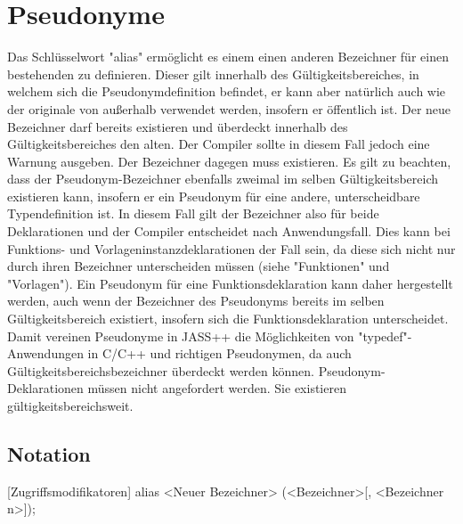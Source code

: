 \chapter{Pseudonyme}

Das Schlüsselwort "alias" ermöglicht es einem einen anderen Bezeichner für einen bestehenden zu definieren. Dieser gilt innerhalb
des Gültigkeitsbereiches, in welchem sich die Pseudonymdefinition befindet, er kann aber natürlich auch wie der originale von außerhalb
verwendet werden, insofern er öffentlich ist.
Der neue Bezeichner darf bereits existieren und überdeckt innerhalb des Gültigkeitsbereiches den alten. Der Compiler sollte in
diesem Fall jedoch eine Warnung ausgeben.
Der Bezeichner dagegen muss existieren.
Es gilt zu beachten, dass der Pseudonym-Bezeichner ebenfalls zweimal im selben Gültigkeitsbereich existieren kann,
insofern er ein Pseudonym für eine andere, unterscheidbare Typendefinition ist.
In diesem Fall gilt der Bezeichner also für beide Deklarationen und der Compiler entscheidet nach Anwendungsfall.
Dies kann bei Funktions- und Vorlageninstanzdeklarationen der Fall sein, da diese sich nicht nur durch ihren Bezeichner
unterscheiden müssen (siehe "Funktionen" und "Vorlagen").
Ein Pseudonym für eine Funktionsdeklaration kann daher hergestellt werden, auch wenn der Bezeichner des Pseudonyms bereits
im selben Gültigkeitsbereich existiert, insofern sich die Funktionsdeklaration unterscheidet.
Damit vereinen Pseudonyme in JASS++ die Möglichkeiten von "typedef"-Anwendungen in C/C++ und richtigen Pseudonymen, da auch
Gültigkeitsbereichsbezeichner überdeckt werden können.
Pseudonym-Deklarationen müssen nicht angefordert werden. Sie existieren gültigkeitsbereichsweit.

\section{Notation}
[Zugriffsmodifikatoren] alias <Neuer Bezeichner> (<Bezeichner>[, <Bezeichner n>]);